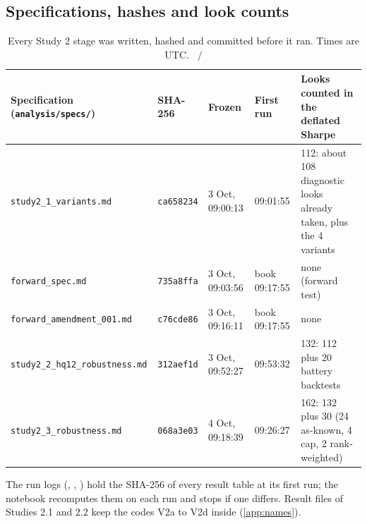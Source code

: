 \subsection*{Specifications, hashes and look counts}
\begin{table}[H]
\centering\footnotesize
\caption{Every Study 2 stage was written, hashed and committed before it ran. Times are UTC. \hfill\tagp\ / \tagf}
\label{tab:specs}
\begin{tabularx}{\textwidth}{@{}l l l l X@{}}
\toprule
Specification (\texttt{analysis/specs/}) & SHA-256 & Frozen & First run & Looks counted in the deflated Sharpe \\
\midrule
\texttt{study2\_1\_variants.md} & \texttt{ca658234} & 3 Oct, 09:00:13 & 09:01:55 & 112: about 108 diagnostic looks already taken, plus the 4 variants \\ %
\texttt{forward\_spec.md} & \texttt{735a8ffa} & 3 Oct, 09:03:56 & book 09:17:55 & none (forward test) \\ %
\texttt{forward\_amendment\_001.md} & \texttt{c76cde86} & 3 Oct, 09:16:11 & book 09:17:55 & none \\ %
\texttt{study2\_2\_hq12\_robustness.md} & \texttt{312aef1d} & 3 Oct, 09:52:27 & 09:53:32 & 132: 112 plus 20 battery backtests \\ %
\texttt{study2\_3\_robustness.md} & \texttt{068a3e03} & 4 Oct, 09:18:39 & 09:26:27 & 162: 132 plus 30 (24 as-known, 4 cap, 2 rank-weighted) \\ %
\bottomrule
\end{tabularx}
\end{table}
The run logs (, , ) hold the SHA-256 of every result table at its first run; the notebook recomputes them on each run and stops if one differs. Result files of Studies 2.1 and 2.2 keep the codes V2a to V2d inside (\cref{app:names}).

